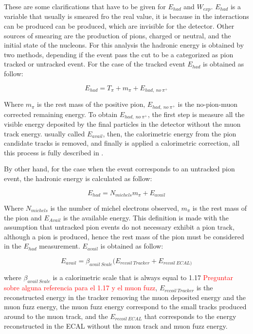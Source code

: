 These are some clarifications that have to be given for $E_{had}$ and $W_{exp}$. $E_{had}$ is a variable that usually is smeared fro the real value, it is because in the interactions can be produced can be produced, which are invisible for the detector. Other sources of smearing are the production of pions, charged or neutral, and the initial state of the nucleons. For this analysis the hadronic energy is obtained by two methods, depending if the event pass the cut to be a categorized as pion tracked or untracked event. For the case of the tracked event $E_{had}$ is obtained as follow:

\begin{equation}
    E_{had} = T_\pi + m_\pi + E_{had,\ no\ \pi^+}
    \label{eq:EhadTracked}
\end{equation}

Where $m_\pi$ is the rest mass of the positive pion, $E_{had,\ no\ \pi^+}$ is the  no-pion-muon corrected remaining energy. To obtain $E_{had,\ no\ \pi^+}$, the first step is measure all the visible energy deposited by the final particles in the detector without the muon track energy. usually called $E_{avail}$, then, the calorimetric energy from the pion candidate tracks is removed, and finally is applied a calorimetric correction, all this process is fully described in \cite{AaronThesis}.  

By other hand, for the case when the event corresponds to an untracked pion event, the hadronic energy is calculated as follow: 

\begin{equation}
    E_{had} = N_{michels}m_\pi + E_{avail}
    \label{eq:EhadUntracked}
\end{equation}

Where $N_{michels}$ is the number of michel electrons observed, $m_\pi$ is the rest mass of the pion and $E_{Avail}$ is the available energy. This definition is made with the assumption that untracked pion events do not necessary exhibit a pion track, although a pion is produced, hence the rest mass of the pion must be considered in the $E_{had}$ measurement. $E_{avail}$ is obtained as follow: 

\begin{equation}
    E_{avail} = \beta_{avail\ Scale}(E_{recoil\ Tracker} + E_{recoil\ ECAL)}
\end{equation}

where $\beta_{avail\ Scale}$ is a calorimetric scale that is always equal to 1.17 \textcolor{red}{Preguntar sobre alguna referencia para el 1.17 y el muon fuzz}, $E_{recoil\ Tracker}$ is the reconstructed energy in the tracker removing the muon deposited energy and the muon fuzz energy, the muon fuzz energy correspond to the small tracks produced around to the muon track, and the $E_{recoil\ ECAL}$ that corresponds to the energy reconstructed in the ECAL without the muon track and muon fuzz energy.

